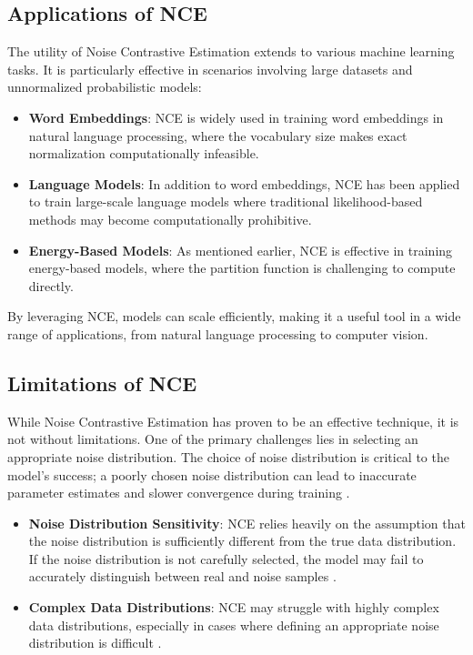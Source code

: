 \subsection{Applications of NCE}

The utility of Noise Contrastive Estimation extends to various machine learning tasks. It is particularly effective in scenarios involving large datasets and unnormalized probabilistic models:
\begin{itemize}
    \item \textbf{Word Embeddings}: NCE is widely used in training word embeddings in natural language processing, where the vocabulary size makes exact normalization computationally infeasible.
    \item \textbf{Language Models}: In addition to word embeddings, NCE has been applied to train large-scale language models where traditional likelihood-based methods may become computationally prohibitive.
    \item \textbf{Energy-Based Models}: As mentioned earlier, NCE is effective in training energy-based models, where the partition function is challenging to compute directly.
\end{itemize}

By leveraging NCE, models can scale efficiently, making it a useful tool in a wide range of applications, from natural language processing to computer vision.

\subsection{Limitations of NCE}

While Noise Contrastive Estimation has proven to be an effective technique, it is not without limitations. One of the primary challenges lies in selecting an appropriate noise distribution. The choice of noise distribution is critical to the model's success; a poorly chosen noise distribution can lead to inaccurate parameter estimates and slower convergence during training \citep{10.48550/arxiv.2110.11271}.

\begin{itemize}
    \item \textbf{Noise Distribution Sensitivity}: NCE relies heavily on the assumption that the noise distribution is sufficiently different from the true data distribution. If the noise distribution is not carefully selected, the model may fail to accurately distinguish between real and noise samples \citep{10.48550/arxiv.2110.11271}.
    \item \textbf{Complex Data Distributions}: NCE may struggle with highly complex data distributions, especially in cases where defining an appropriate noise distribution is difficult \citep{10.48550/arxiv.2110.11271}.
\end{itemize}

